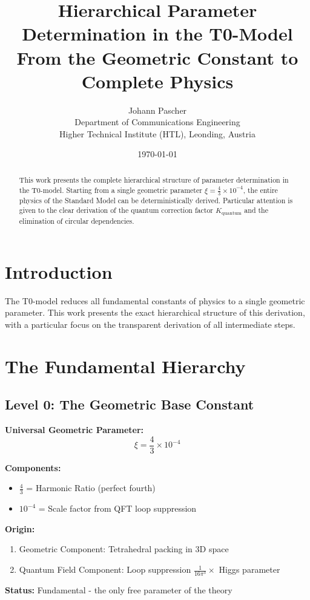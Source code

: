\documentclass[12pt,a4paper]{article}
\title{Hierarchical Parameter Determination in the T0-Model \\
	\large From the Geometric Constant to Complete Physics}
\author{Johann Pascher\\
	Department of Communications Engineering\\
	Higher Technical Institute (HTL), Leonding, Austria}
\date{\today}
\newcommand{\xipar}{\xi}
\newcommand{\Kquantum}{K_{\text{quantum}}}
\begin{document}
	
	\maketitle
	
	\begin{abstract}
		This work presents the complete hierarchical structure of parameter determination in the T0-model. Starting from a single geometric parameter $\xipar = \frac{4}{3} \times 10^{-4}$, the entire physics of the Standard Model can be deterministically derived. Particular attention is given to the clear derivation of the quantum correction factor $\Kquantum$ and the elimination of circular dependencies.
	\end{abstract}
	
	\tableofcontents
	\newpage
	
	\section{Introduction}
	
	The T0-model reduces all fundamental constants of physics to a single geometric parameter. This work presents the exact hierarchical structure of this derivation, with a particular focus on the transparent derivation of all intermediate steps.
	
	\section{The Fundamental Hierarchy}
	
	\subsection{Level 0: The Geometric Base Constant}
	
	\begin{fundamental}
		\textbf{Universal Geometric Parameter:}
		\begin{equation}
			\boxed{\xipar = \frac{4}{3} \times 10^{-4}}
		\end{equation}
		
		\textbf{Components:}
		\begin{itemize}
			\item $\frac{4}{3}$ = Harmonic Ratio (perfect fourth)
			\item $10^{-4}$ = Scale factor from QFT loop suppression
		\end{itemize}
		
		\textbf{Origin:} 
		\begin{enumerate}
			\item Geometric Component: Tetrahedral packing in 3D space
			\item Quantum Field Component: Loop suppression $\frac{1}{16\pi^3} \times$ Higgs parameter
		\end{enumerate}
		
		\textbf{Status:} Fundamental - the only free parameter of the theory
	\end{fundamental}
	
\end{document}
